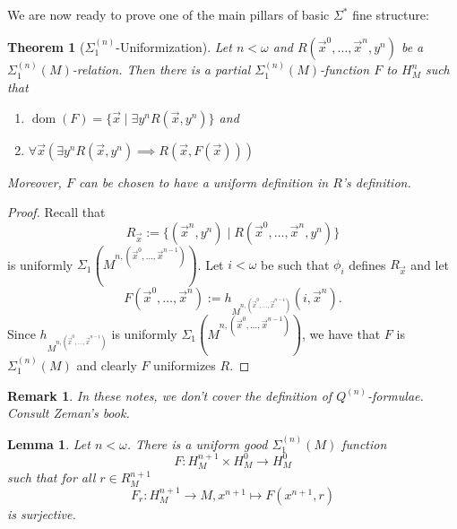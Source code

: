 \documentclass[12pt,a4paper]{article}
\theoremstyle{nicestyle}
\newtheorem{theorem}{Theorem}[subsection]
\newtheorem{lemma}{Lemma}[subsection]
\newtheorem{remark}{Remark}[subsection]
\DeclareMathOperator{\dom}{dom}
\begin{document}
We are now ready to prove one of the main pillars of basic
$\Sigma^{*}$ fine structure:

\begin{theorem}[$\Sigma^{(n)}_{1}$-Uniformization]
  Let $n < \omega$ and $R(\vec{x}^{0}, \ldots, \vec{x}^{n}, y^n)$ be a
  $\Sigma^{(n)}_1(M)$-relation. Then there is a partial
  $\Sigma^{(n)}_1(M)$-function $F$ to $H^n_M$ such that
  \begin{enumerate}
  \item $\dom(F) = \{ \vec{x} \mid \exists y^{n} R(\vec{x}, y^{n}) \}$ and
  \item
    $\forall \vec{x} ( \exists y^{n} R(\vec{x}, y^{n}) \implies
    R(\vec{x}, F(\vec{x})))$
  \end{enumerate}
  Moreover, $F$ can be chosen to have a uniform definition in $R$'s
  definition.
\end{theorem}

\begin{proof}
  Recall that
  \[
    R_{\vec{x}} := \{ (\vec{x}^{n}, y^{n}) \mid R(\vec{x}^{0}, \ldots,
    \vec{x}^{n}, y^{n}) \}
  \]
  is uniformly
  $\Sigma_1(M^{n, (\vec{x}^{0}, \ldots, \vec{x}^{n-1})})$. Let
  $i < \omega$ be such that $\phi_i$ defines $R_{\vec{x}}$ and let
  \[
    F(\vec{x}^{0}, \ldots, \vec{x}^{n}) := h_{M^{n, (\vec{x}^{0},
        \ldots, \vec{x}^{n-1})}}(i, \vec{x}^{n}).
  \]
  Since $h_{M^{n, (\vec{x}^{0}, \ldots, \vec{x}^{n-1})}}$ is uniformly
  $\Sigma_1(M^{n, (\vec{x}^{0}, \ldots, \vec{x}^{n-1})})$, we have
  that $F$ is $\Sigma^{(n)}_1(M)$ and clearly $F$ uniformizes $R$.
\end{proof}

\begin{remark}
  In these notes, we don't cover the definition of
  $Q^{(n)}$-formulae. Consult Zeman's book.
\end{remark}

\begin{lemma} \label{lemma:Skolem functions}
  Let $n < \omega$. There is a uniform good $\Sigma^{(n)}_{1}(M)$ function
  \[
    F \colon H^{n+1}_{M} \times H^{0}_{M} \to H^{0}_{M}
  \]
  such that for all $r \in R^{n+1}_{M}$
  \[
    F_{r} \colon H^{n+1}_{M} \to M, x^{n+1} \mapsto F(x^{n+1}, r)
  \]
  is surjective.
\end{lemma}
\end{document}
